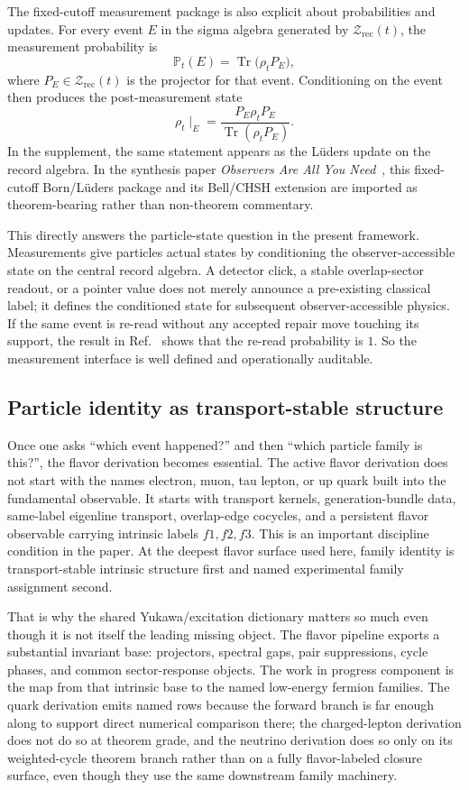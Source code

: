 \documentclass[11pt]{article}
\begin{document}
The fixed-cutoff measurement package is also explicit about probabilities and updates. For every
event \(E\) in the sigma algebra generated by \(\mathcal Z_{\mathrm{rec}}(t)\), the measurement
probability is
\[
\mathbb P_t(E)=\operatorname{Tr}\!\bigl(\rho_t P_E\bigr),
\]
where \(P_E\in\mathcal Z_{\mathrm{rec}}(t)\) is the projector for that event. Conditioning on the
event then produces the post-measurement state
\[
\rho_t\!\mid_E
=
\frac{P_E\rho_t P_E}{\operatorname{Tr}(\rho_t P_E)}.
\]
In the supplement, the same statement appears as the L\"uders update on the record algebra. In
the synthesis paper \emph{Observers Are All You Need}~\cite{ophsynthesis}, this fixed-cutoff
Born/L\"uders package and its Bell/CHSH extension are imported as theorem-bearing rather than
non-theorem commentary.

This directly answers the particle-state question in the present framework. Measurements give particles
actual states by conditioning the observer-accessible state on the central record algebra. A
detector click, a stable overlap-sector readout, or a pointer value does not merely announce a
pre-existing classical label; it defines the conditioned state for subsequent observer-accessible
physics. If the same event is re-read without any accepted repair move touching its support, the
result in Ref.~\cite{ophmicrophysics} shows that the re-read probability is \(1\). So the measurement interface is
well defined and operationally auditable.

\subsection{Particle identity as transport-stable structure}

Once one asks ``which event happened?'' and then ``which particle family is this?'', the
flavor derivation becomes essential. The active flavor derivation does not start with the
names electron, muon, tau lepton, or up quark built into the fundamental observable. It starts
with transport kernels, generation-bundle data, same-label eigenline transport, overlap-edge
cocycles, and a persistent flavor observable carrying intrinsic labels \(f1,f2,f3\). This is an
important discipline condition in the paper. At the deepest flavor surface used here, family
identity is transport-stable intrinsic structure first and named experimental family assignment
second.

That is why the shared Yukawa/excitation dictionary matters so much even though it is not
itself the leading missing object. The flavor pipeline exports a substantial invariant base:
projectors, spectral gaps, pair suppressions, cycle phases, and common sector-response objects.
The work in progress component is the map from that intrinsic base to the named low-energy fermion
families. The quark derivation emits named rows because the forward branch is far enough along to
support direct numerical comparison there; the charged-lepton derivation does not do so at theorem
grade, and the neutrino derivation does so only on its weighted-cycle theorem branch rather than
on a fully flavor-labeled closure surface, even though they use the same downstream family machinery.
\end{document}
